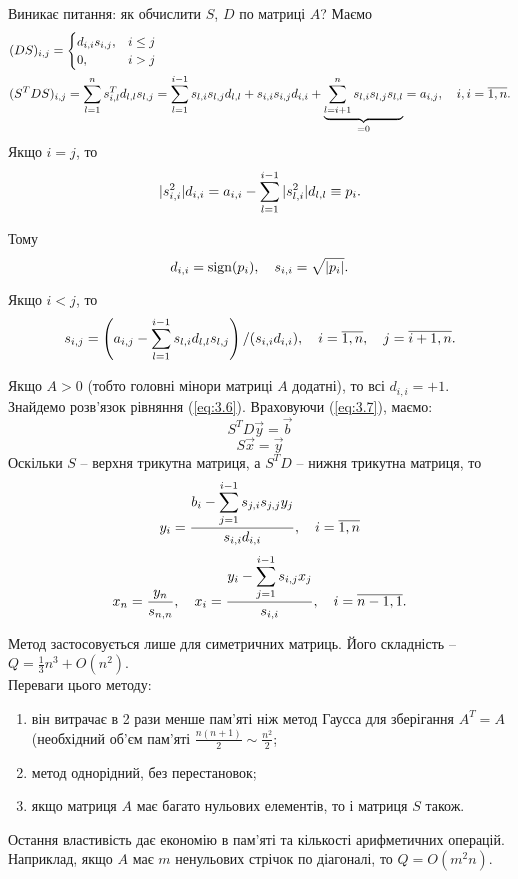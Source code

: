 Виникає питання: як обчислити $S$, $D$ по матриці $A$? Маємо
\begin{equation}
	\label{eq:3.8}
	\begin{aligned}
		& (DS)_{i,j} = \begin{cases} d_{i,i}s_{i,j}, & i \le j \\ 0, & i > j \end{cases} \\
		& (S^TDS)_{i,j} = \displaystyle\sum\limits_{l=1}^n s_{i,l}^T d_{l,l} s_{l, j} = \displaystyle\sum\limits_{l=1}^{i-1} s_{l,i} s_{l, j} d_{l, l} + s_{i,i} s_{i,j} d_{i,i} + \underset{=0}{\underbrace{\displaystyle\sum\limits_{l=i+1}^n s_{l, i} s_{l, j} s_{l,l}}} = a_{i,j}, \quad i,i = \overline{1,n}. 
	\end{aligned}
\end{equation}
Якщо $i = j$, то \[ |s_{i,i}^2|d_{i,i} = a_{i,i} - \displaystyle\sum\limits_{l=1}^{i-1} |s_{l,i}^2| d_{l,l} \equiv p_i.\]

Тому \[ d_{i,i} = \operatorname{sign} (p_i), \quad s_{i,i} = \sqrt{|p_i|}. \]

Якщо $i < j$, то \[ s_{i,j} = \left( a_{i,j} - \displaystyle\sum\limits_{l=1}^{i-1} s_{l,i} d_{l,l} s_{l,j} \right) / (s_{i,i} d_{i,i}), \quad i = \overline{1, n}, \quad j = \overline{i+1, n}. \]

Якщо $A > 0$ (тобто головні мінори матриці $A$ додатні), то всі $d_{i,i} = +1$. \\

Знайдемо розв’язок рівняння (\ref{eq:3.6}). Враховуючи (\ref{eq:3.7}), маємо:
\begin{equation}
	\label{eq:3.9}
	S^T D \vec y = \vec b
\end{equation}
\begin{equation}
	\label{eq:3.10}
	S \vec x = \vec y
\end{equation}
Оскільки $S$ -- верхня трикутна матриця, а $S^TD$ -- нижня трикутна матриця, то
\begin{equation}
	\label{eq:3.11}
	y_i = \dfrac{b_i - \displaystyle\sum\limits_{j=1}^{i-1} s_{j,i}s_{j,j}y_j}{s_{i,i}d_{i,i}}, \quad i=\overline{1,n}
\end{equation}
\begin{equation}
	\label{eq:3.12}
	x_n = \dfrac{y_n}{s_{n,n}}, \quad x_i = \dfrac{y_i - \displaystyle\sum\limits_{j=1}^{i-1} s_{i,j} x_j}{s_{i,i}}, \quad i=\overline{n-1,1}.
\end{equation}

Метод застосовується лише для симетричних матриць. Його складність -- $Q = \frac13 n^3 + O(n^2)$. \\

Переваги цього методу:
\begin{enumerate}
	\item він витрачає в 2 рази менше пам'яті ніж метод Гаусса для зберігання $A^T = A$ (необхідний об'єм пам'яті $\frac{n(n+1)}{2} \sim \frac{n^2}{2}$;
	\item метод однорідний, без перестановок;
	\item якщо матриця $A$ має багато нульових елементів, то і матриця $S$ також.
\end{enumerate}
Остання властивість дає економію в пам'яті та кількості арифметичних операцій. Наприклад, якщо $A$ має $m$ ненульових стрічок по діагоналі, то $Q = O(m^2n)$.

